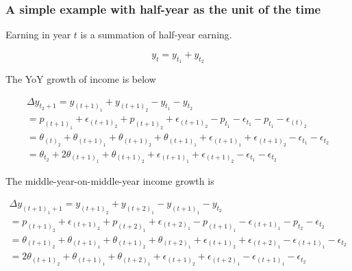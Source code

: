\documentclass[12pt,notitlepage,onecolumn,aps,pra]{article}
\begin{document}
    \hypertarget{a-simple-example-with-half-year-as-the-unit-of-the-time}{%
\subsubsection{A simple example with half-year as the unit of the
time}\label{a-simple-example-with-half-year-as-the-unit-of-the-time}}

Earning in year \(t\) is a summation of half-year earning.

\begin{equation}
y_t = y_{t_1}+ y_{t_2} 
\end{equation}

The YoY growth of income is below

\begin{equation}
\begin{split}
\Delta y_{t_2+1} = y_{(t+1)_1}+ y_{(t+1)_2} - y_{t_1 } - y_{t_2}  \\
 = p_{(t+1)_1} + \epsilon_{(t+1)_2} + p_{(t+1)_2} + \epsilon_{(t+1)_2} - p_{t_1} - \epsilon_{t_1} - p_{t_1} - \epsilon_{(t)_2 } \\
 = \theta_{(t)_2} + \theta_{(t+1)_1} + \theta_{(t+1)_2} + \theta_{(t+1)_1} + \epsilon_{(t+1)_1} + \epsilon_{(t+1)_2} - \epsilon_{t_1} - \epsilon_{t_2} \\
 =  \theta_{t_2} + 2\theta_{(t+1)_1} + \theta_{(t+1)_2} + \epsilon_{(t+1)_1} + \epsilon_{(t+1)_2} - \epsilon_{t_1} - \epsilon_{t_2} 
\end{split}
\end{equation}

The middle-year-on-middle-year income growth is

\begin{equation}
\begin{split}
\Delta y_{(t+1)_1+1} = y_{(t+1)_2}+ y_{(t+2)_1} - y_{(t+1)_1} - y_{t_2}  \\
 = p_{(t+1)_2} + \epsilon_{(t+1)_2} + p_{(t+2)_1} + \epsilon_{(t+2)_1} - p_{(t+1)_1} - \epsilon_{(t+1)_1} - p_{t_2} - \epsilon_{t_2 } \\
 = \theta_{(t+1)_2} + \theta_{(t+1)_1} + \theta_{(t+1)_2} + \theta_{(t+2)_1} + \epsilon_{(t+1)_2} + \epsilon_{(t+2)_1} - \epsilon_{(t+1)_1} - \epsilon_{t_2 } \\
 = 2\theta_{(t+1)_2} + \theta_{(t+1)_1} + \theta_{(t+2)_1} + \epsilon_{(t+1)_2} + \epsilon_{(t+2)_1} - \epsilon_{(t+1)_1} - \epsilon_{t_2 }
\end{split}
\end{equation}
\end{document}
